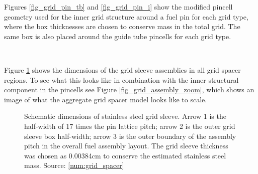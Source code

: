 Figures \ref{fig_grid_pin_tb} and \ref{fig_grid_pin_i} show the modified pincell
geometry used for the inner grid structure around a fuel pin for each grid type,
where the box thicknesses are chosen to conserve mass in the total grid. The
same box is also placed around the guide tube pincells for each grid type.




~

Figure \ref{fig_grid_assembly} shows the dimensions of the grid sleeve
assemblies in all grid spacer regions. To see what this looks like
in combination with the inner structural component in the pincells see Figure
\ref{fig_grid_assembly_zoom}, which shows an image of what the aggregate grid
spacer model looks like to scale.


\begin{figure}[htbp]
    \def\sleeveDim{10.74798}

    \centering

    \caption[Schematic dimensions of stainless steel grid sleeve model]{Schematic
    dimensions of stainless steel grid sleeve. Arrow 1 is the half-width of 17
    times the pin lattice pitch; arrow 2 is the outer grid sleeve box
    half-width; arrow 3 is the outer boundary of the assembly pitch in the
    overall fuel assembly layout. The grid sleeve thickness was chosen as
    0.00384cm to conserve the estimated stainless steel mass. Source:
    \ref{num:grid_spacer}\label{fig_grid_assembly}}
\end{figure}


